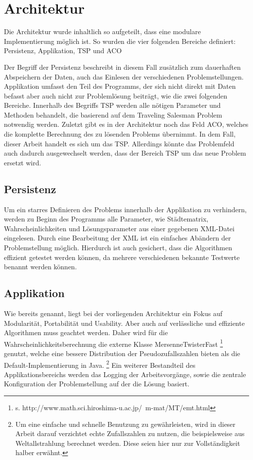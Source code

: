 \section{Architektur}{
	Die Architektur wurde inhaltlich so aufgeteilt, dass eine modulare Implementierung möglich ist. So wurden die vier folgenden Bereiche definiert: Persistenz, Applikation, TSP und ACO
	
	Der Begriff der Persistenz beschreibt in diesem Fall zusätzlich zum dauerhaften Abspeichern der Daten, auch das Einlesen der verschiedenen Problemstellungen.
	\newline
	Applikation umfasst den Teil des Programms, der sich nicht direkt mit Daten befasst aber auch nicht zur Problemlösung beiträgt, wie die zwei folgenden Bereiche.
	\newline
	Innerhalb des Begriffs TSP werden alle nötigen Parameter und Methoden behandelt, die basierend auf dem Traveling Salesman Problem notwendig werden. 
	\newline
	Zuletzt gibt es in der Architektur noch das Feld ACO, welches die komplette Berechnung des zu lösenden Problems übernimmt. In dem Fall, dieser Arbeit handelt es sich um das TSP. Allerdings könnte das Problemfeld auch dadurch ausgewechselt werden, dass der Bereich TSP um das neue Problem ersetzt wird.
	
	\subsection{Persistenz}
	Um ein starres Definieren des Problems innerhalb der Applikation zu verhindern, werden zu Beginn des Programms alle Parameter, wie Städtematrix, Wahrscheinlichkeiten und Lösungsparameter aus einer gegebenen XML-Datei eingelesen. Durch eine Bearbeitung der XML ist ein einfaches Abändern der Problemstellung möglich. Hierdurch ist auch gesichert, dass die Algorithmen effizient getestet werden können, da mehrere verschiedenen bekannte Testwerte benannt werden können.
	
	\subsection{Applikation}
	Wie bereits genannt, liegt bei der vorliegenden Architektur ein Fokus auf Modularität, Portabilität und Usability. Aber auch auf verlässliche und effiziente Algorithmen muss geachtet werden. Daher wird für die Wahrscheinlichkeitsberechnung die externe Klasse MersenneTwisterFast \footnote{s. http://www.math.sci.hiroshima-u.ac.jp/~m-mat/MT/emt.html} genutzt, welche eine bessere Distribution der Pseudozufallszahlen bieten als die Default-Implementierung in Java.
	\footnote{Um eine einfache und schnelle Benutzung zu gewährleisten, wird in dieser Arbeit darauf verzichtet echte Zufallszahlen zu nutzen, die beispielsweise aus Weltallstrahlung berechnet werden. Diese seien hier nur zur Vollständigkeit halber erwähnt.}
	Ein weiterer Bestandteil des Applikationsbereichs werden das Logging der Arbeitsvorgänge, sowie die zentrale Konfiguration der Problemstellung auf der die Lösung basiert.
	
}
